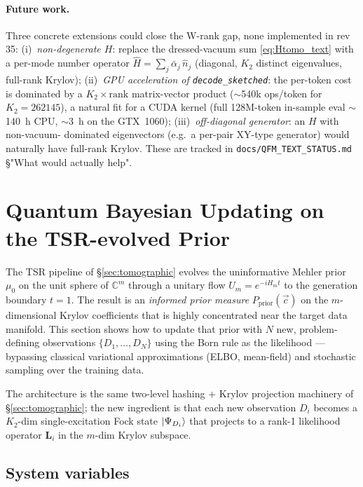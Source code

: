 \documentclass[11pt, a4paper]{article}
\newcommand{\Cset}{\mathbb{C}}
\begin{document}
\paragraph{Future work.} Three concrete extensions could close
the W-rank gap, none implemented in rev 35:
(i)~\emph{non-degenerate $H$}: replace the
dressed-vacuum sum \eqref{eq:Htomo_text} with a per-mode number
operator $\hat H=\sum_j\bar\alpha_j\,\hat n_j$ (diagonal,
$K_2$ distinct eigenvalues, full-rank Krylov);
(ii)~\emph{GPU acceleration of \texttt{decode\_sketched}}: the
per-token cost is dominated by a $K_2\times\mathrm{rank}$
matrix-vector product ($\sim$540k ops/token for $K_2=262145$),
a natural fit for a CUDA kernel (full 128M-token in-sample eval
$\sim$140~h CPU, $\sim$3~h on the GTX~1060);
(iii)~\emph{off-diagonal generator}: an $H$ with non-vacuum-
dominated eigenvectors (e.g.\ a per-pair XY-type generator) would
naturally have full-rank Krylov. These are tracked in
\texttt{docs/QFM\_TEXT\_STATUS.md} §"What would actually help".

\section{Quantum Bayesian Updating on the TSR-evolved Prior}
\label{sec:bayes}

The TSR pipeline of \S\ref{sec:tomographic} evolves the uninformative
Mehler prior $\mu_0$ on the unit sphere of $\Cset^m$ through a unitary
flow $U_m=e^{-iH_m t}$ to the generation boundary $t=1$. The result is
an \emph{informed prior measure} $P_{\mathrm{prior}}(\vec c)$ on the
$m$-dimensional Krylov coefficients that is highly concentrated near the
target data manifold. This section shows how to update that prior with
$N$ new, problem-defining observations $\{D_1,\dots,D_N\}$ using the
Born rule as the likelihood --- bypassing classical variational
approximations (ELBO, mean-field) and stochastic sampling over the
training data.

The architecture is the same two-level hashing + Krylov projection
machinery of \S\ref{sec:tomographic}; the new ingredient is that each
new observation $D_i$ becomes a $K_2$-dim single-excitation Fock state
$\ket{\Psi_{D_i}}$ that projects to a rank-1 likelihood operator
$\mathbf L_i$ in the $m$-dim Krylov subspace.

\subsection{System variables}
\end{document}
